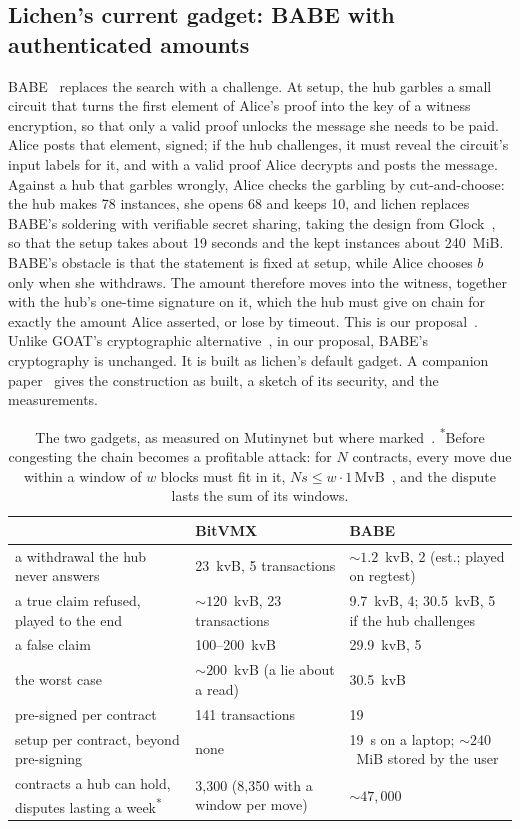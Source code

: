\documentclass[11pt]{article}
\begin{document}
\subsection{Lichen's current gadget: BABE with authenticated amounts}

BABE~\cite{babe} replaces the search with a challenge. At setup, the hub
garbles a small circuit that turns the first element of Alice's proof
into the key of a witness encryption, so that only a valid proof unlocks
the message she needs to be paid. Alice posts that element, signed; if
the hub challenges, it must reveal the circuit's input labels for it,
and with a valid proof Alice decrypts and posts the message. Against a
hub that garbles wrongly, Alice checks the garbling by cut-and-choose: the
hub makes 78 instances, she opens 68 and keeps 10, and lichen replaces
BABE's soldering with verifiable secret sharing, taking the design from Glock~\cite{glock}, so that the setup takes
about 19 seconds and the kept instances about 240~MiB. BABE's obstacle is
that the statement is fixed at setup, while Alice chooses $b$ only when
she withdraws. The amount therefore moves into the witness, together with
the hub's one-time signature on it, which the hub must give on chain for
exactly the amount Alice asserted, or lose by timeout. This is our
proposal~\cite{delving}. Unlike GOAT's cryptographic
alternative~\cite{goat}, in our proposal, BABE's cryptography is
unchanged. It is built as lichen's default gadget. A
companion paper~\cite{lichenbuilt} gives the construction as built, a
sketch of its security, and the measurements.

\begin{table}[!htp]
\centering
\small
\begin{tabularx}{\linewidth}{>{\raggedright\arraybackslash}p{58mm}LL}
\toprule
& BitVMX & BABE \\
\midrule
a withdrawal the hub never answers & 23~kvB, 5 transactions & ${\sim}1.2$~kvB, 2 (est.; played on regtest) \\
a true claim refused, played to the end & ${\sim}120$~kvB, 23 transactions & 9.7~kvB, 4; 30.5~kvB, 5 if the hub challenges \\
a false claim & 100--200~kvB & 29.9~kvB, 5 \\
the worst case & ${\sim}200$~kvB (a lie about a read) & 30.5~kvB \\
pre-signed per contract & 141 transactions & 19 \\
setup per contract, beyond pre-signing & none & 19~s on a laptop; ${\sim}240$~MiB stored by the user \\
contracts a hub can hold, disputes lasting a week\textsuperscript{*} & 3,300 (8,350 with a window per move) & ${\sim}47{,}000$ \\
\bottomrule
\end{tabularx}
\caption{The two gadgets, as measured on Mutinynet but where marked~\cite{lichenbitvmx,lichenbuilt}.
\textsuperscript{*}Before congesting the chain becomes a profitable
attack: for $N$ contracts, every move due within a window of $w$ blocks
must fit in it, $N s \le w \cdot 1\,\mathrm{MvB}$~\cite{floodloot}, and
the dispute lasts the sum of its windows.}
\label{tab:gadgets}
\end{table}
\end{document}
